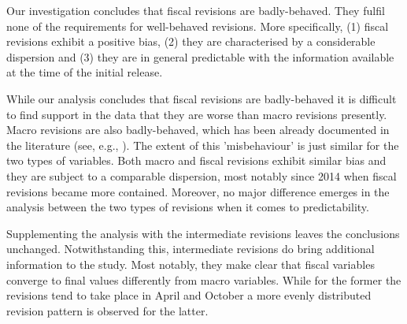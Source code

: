 Our investigation concludes that fiscal revisions are badly-behaved. They fulfil none of the requirements for well-behaved revisions. More specifically, (1) fiscal revisions exhibit a positive bias, (2) they are characterised by a considerable dispersion and (3) they are in general predictable with the information available at the time of the initial release.

While our analysis concludes that fiscal revisions are badly-behaved it is difficult to find support in the data that they are worse than macro revisions presently. Macro revisions are also badly-behaved, which has been already documented in the literature (see, e.g., \citet{Faust2005NewsAN}). The extent of this 'misbehaviour' is just similar for the two types of variables. Both macro and fiscal revisions exhibit similar bias and they are subject to a comparable dispersion, most notably since 2014 when fiscal revisions became more contained. Moreover, no major difference emerges in the analysis between the two types of revisions when it comes to predictability.

Supplementing the analysis with the intermediate revisions leaves the conclusions unchanged. Notwithstanding this, intermediate revisions do bring additional information to the study. Most notably, they make clear that fiscal variables converge to final values differently from macro variables. While for the former the revisions tend to take place in April and October a more evenly distributed revision pattern is observed for the latter.